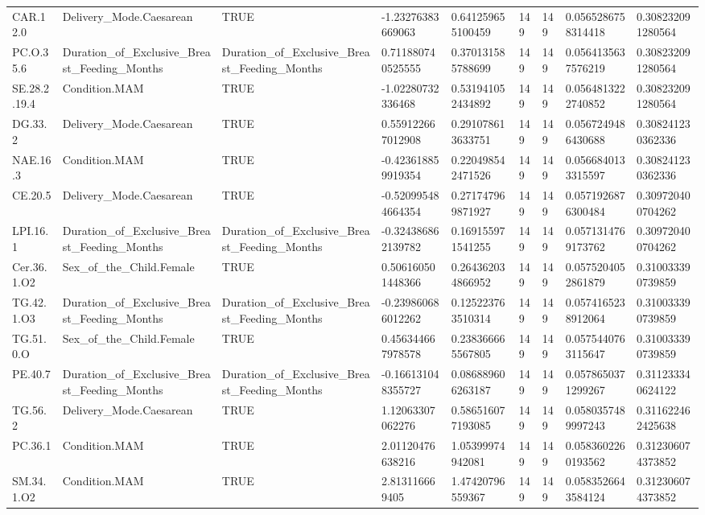 \begin{longtable}{lllllllll}
CAR.12.0 & Delivery\_Mode.Caesarean & TRUE & -1.23276383669063 & 0.641259655100459 & 149 & 149 & 0.0565286758314418 & 0.308232091280564 \\
PC.O.35.6 & Duration\_of\_Exclusive\_Breast\_Feeding\_Months & Duration\_of\_Exclusive\_Breast\_Feeding\_Months & 0.711880740525555 & 0.370131585788699 & 149 & 149 & 0.0564135637576219 & 0.308232091280564 \\
SE.28.2.19.4 & Condition.MAM & TRUE & -1.02280732336468 & 0.531941052434892 & 149 & 149 & 0.0564813222740852 & 0.308232091280564 \\
DG.33.2 & Delivery\_Mode.Caesarean & TRUE & 0.559122667012908 & 0.291078613633751 & 149 & 149 & 0.0567249486430688 & 0.308241230362336 \\
NAE.16.3 & Condition.MAM & TRUE & -0.423618859919354 & 0.220498542471526 & 149 & 149 & 0.0566840133315597 & 0.308241230362336 \\
CE.20.5 & Delivery\_Mode.Caesarean & TRUE & -0.520995484664354 & 0.271747969871927 & 149 & 149 & 0.0571926876300484 & 0.309720400704262 \\
LPI.16.1 & Duration\_of\_Exclusive\_Breast\_Feeding\_Months & Duration\_of\_Exclusive\_Breast\_Feeding\_Months & -0.324386862139782 & 0.169155971541255 & 149 & 149 & 0.0571314769173762 & 0.309720400704262 \\
Cer.36.1.O2 & Sex\_of\_the\_Child.Female & TRUE & 0.506160501448366 & 0.264362034866952 & 149 & 149 & 0.0575204052861879 & 0.310033390739859 \\
TG.42.1.O3 & Duration\_of\_Exclusive\_Breast\_Feeding\_Months & Duration\_of\_Exclusive\_Breast\_Feeding\_Months & -0.239860686012262 & 0.125223763510314 & 149 & 149 & 0.0574165238912064 & 0.310033390739859 \\
TG.51.0.O & Sex\_of\_the\_Child.Female & TRUE & 0.456344667978578 & 0.238366665567805 & 149 & 149 & 0.0575440763115647 & 0.310033390739859 \\
PE.40.7 & Duration\_of\_Exclusive\_Breast\_Feeding\_Months & Duration\_of\_Exclusive\_Breast\_Feeding\_Months & -0.166131048355727 & 0.086889606263187 & 149 & 149 & 0.0578650371299267 & 0.311233340624122 \\
TG.56.2 & Delivery\_Mode.Caesarean & TRUE & 1.12063307062276 & 0.586516077193085 & 149 & 149 & 0.0580357489997243 & 0.311622462425638 \\
PC.36.1 & Condition.MAM & TRUE & 2.01120476638216 & 1.05399974942081 & 149 & 149 & 0.0583602260193562 & 0.312306074373852 \\
SM.34.1.O2 & Condition.MAM & TRUE & 2.813116669405 & 1.47420796559367 & 149 & 149 & 0.0583526643584124 & 0.312306074373852 \\

\end{longtable}
